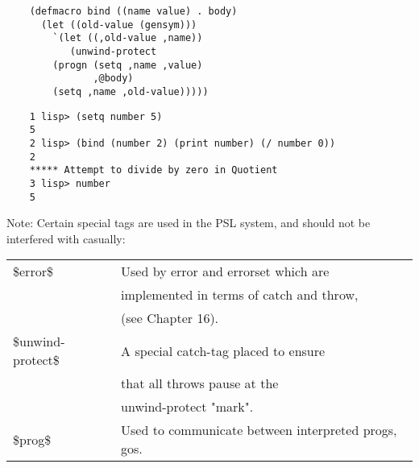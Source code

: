\begin{verbatim}
    (defmacro bind ((name value) . body)
      (let ((old-value (gensym)))
        `(let ((,old-value ,name))
           (unwind-protect
        (progn (setq ,name ,value)
               ,@body)
        (setq ,name ,old-value)))))
\end{verbatim}
\begin{verbatim}
    1 lisp> (setq number 5)
    5
    2 lisp> (bind (number 2) (print number) (/ number 0))
    2
    ***** Attempt to divide by zero in Quotient
    3 lisp> number
    5
\end{verbatim}
  Note:  Certain  special  tags  are used in the PSL system, and
should not be interfered with casually:\\

\begin{tabular}{ll}

\$error\$ &       Used by error and errorset which  are\\  
&																implemented in terms of catch and throw,\\
&               	(see Chapter 16).\\


\$unwind-protect\$ & A special  catch-tag placed to ensure\\ 
&																		 that all throws pause at the \\
&              				 unwind-protect "mark".\\


\$prog\$ &        Used to communicate between interpreted progs, gos.\\
\end{tabular}
